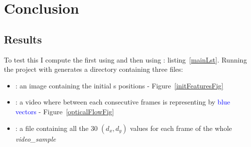 
\chapter{Conclusion} %

\label{Conclusion} %




\section{Results}

To test this \api{} I compute the \flow{} first using  and then using : listing~\ref{mainLst}. Running the project with  generates a directory containing three files:
\begin{itemize}
	\item {}: an image containing the initial \feat{}s positions - Figure~\ref{initFeaturesFig}
	\item {}: a video where \flow{} between each consecutive frames is representing by \textcolor{blue}{blue vectors} - Figure~\ref{opticalFlowFig}
	\item {}: a  file containing all the 30 $(d_{x},d_{y})$ values for each frame of the whole \emph{video\_sample}
\end{itemize}


